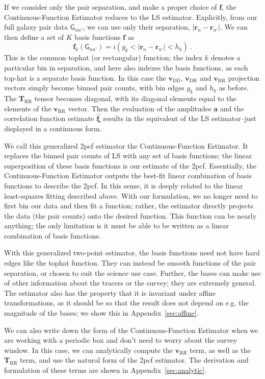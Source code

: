 \documentclass[modern]{aastex62}
\newcommand{\cf}{2pcf\xspace} %
\newcommand{\est}{the Continuous-Function Estimator\xspace}
\newcommand{\LS}{LS\xspace}
\newcommand{\bld}[1]{\bm{#1}} %
\newcommand{\vv}[1]{\bld{v}_\mathrm{#1}}
\newcommand{\TT}[1]{\bld{T}_\mathrm{#1}}
\newcommand{\ff}{\bld{f}}
\newcommand{\GG}[1]{\mathsf{G}_{#1}}
\begin{document}
If we consider only the pair separation, and make a proper choice of $\ff$, \est reduces to the \LS estimator.
Explicitly, from our full galaxy pair data $\GG{n n'}$, we can use only their separation,  $|\bld{r}_n - \bld{r}_{n'}|$.
We can then define a set of $K$ basis functions $\ff$ as
\begin{equation}
    \label{eq:ff_separation}
    \ff_k(\GG{n n'}) =  i(g_k < |\bld{r}_n - \bld{r}_{n'}| < h_k) ~.
\end{equation}
This is the common tophat (or rectangular) function; the index $k$ denotes a particular bin in separation, and here also indexes the basis functions, as each top-hat is a separate basis function.
In this case the $\vv{DD}$, $\vv{DR}$ and $\vv{RR}$ projection vectors simply become binned pair counts, with bin edges $g_k$ and $h_k$ as before.
The $\TT{RR}$ tensor becomes diagonal, with its diagonal elements equal to the elements of the $\vv{RR}$ vector.
Then the evaluation of the amplitudes $\bld{a}$ and the correlation function estimate $\bld{\hat{\xi}}$ results in the equivalent of the \LS estimator--just displayed in a continuous form.

We call this generalized \cf estimator \est.
It replaces the binned pair counts of \LS with any set of basis functions; the linear superposition of these basis functions is our estimate of the \cf.
Essentially, \est outputs the best-fit linear combination of basis functions to describe the \cf.
In this sense, it is deeply related to the linear least-squares fitting described above.
With our formulation, we no longer need to first bin our data and then fit a function; rather, the estimator directly projects the data (the pair counts) onto the desired function.
This function can be nearly anything; the only limitation is it must be able to be written as a linear combination of basis functions.

With this generalized two-point estimator, the basis functions need not have hard edges like the tophat function.
They can instead be smooth functions of the pair separation, or chosen to suit the science use case.
Further, the bases can make use of other information about the tracers or the survey; they are extremely general.
The estimator also has the property that it is invariant under affine transformations, as it should be so that the result does not depend on e.g. the magnitude of the bases; we show this in Appendix~\ref{sec:affine}.

We can also write down the form of \est when we are working with a periodic box and don't need to worry about the survey window.
In this case, we can analytically compute the $\vv{RR}$ term, as well as the $\TT{RR}$ term, and use the natural form of the \cf estimator.
The derivation and formulation of these terms are shown in Appendix~\ref{sec:analytic}.
\end{document}

